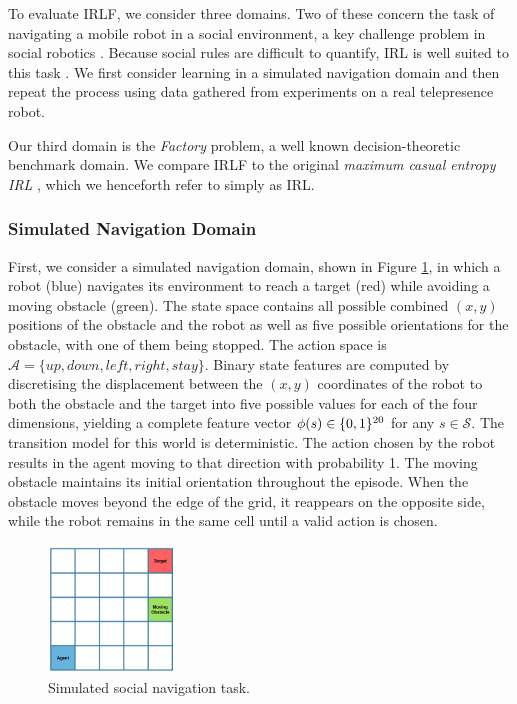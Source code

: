 \documentclass[a4paper,11pt]{report}
\begin{document}
To evaluate IRLF, we consider three domains. Two of these concern the task of navigating a mobile robot in a social environment, a key challenge problem in social robotics \cite{pacchierotti2006embodied}. Because social rules are difficult to quantify, IRL is well suited to this task \cite{henry2010learning,vasquez2014inverse}. We first consider learning in a simulated navigation domain and then repeat the process using data gathered from experiments on a real telepresence robot.

 Our third domain is the \emph{Factory} problem, a well known decision-theoretic benchmark domain\cite{dearden1997abstraction}.
 We compare IRLF to the original \emph{maximum casual entropy IRL} \cite{ziebart2008maximum}, which we henceforth refer to simply as IRL. 

\subsubsection{Simulated Navigation Domain \label{sec:sim_nav}}

First, we consider a simulated navigation domain, shown in Figure \ref{fig:gridworld}, in which a robot (blue) navigates its environment to reach a target (red) while avoiding a moving
obstacle (green). The state space contains all possible combined $(x,y)$ positions of the obstacle and the robot as well as five possible orientations for the obstacle, with one of them being stopped. The action space is $\mathcal{A} = \{up,down,left,right,stay\}$. Binary state features are computed by discretising the displacement between the $(x,y)$ coordinates of the robot to both the obstacle and the target into five possible values for each of the four dimensions, yielding a complete feature vector $\phi(s)\in\mathbb \{0,1\}^{20}$ for any $s\in\mathcal{S}$. The transition model for this world is deterministic. The action chosen by the robot results in the agent moving to that direction with probability 1. The moving obstacle maintains its initial orientation throughout the episode. When the obstacle moves beyond the edge of the grid, it reappears on the opposite side, while the robot remains in the same cell until a valid action is chosen.

\begin{figure}
\centering
    \includegraphics[width=0.3\textwidth]{figures/gridworld.png}
  \caption{Simulated social navigation task.} \label{fig:gridworld}
\end{figure}
\end{document}
